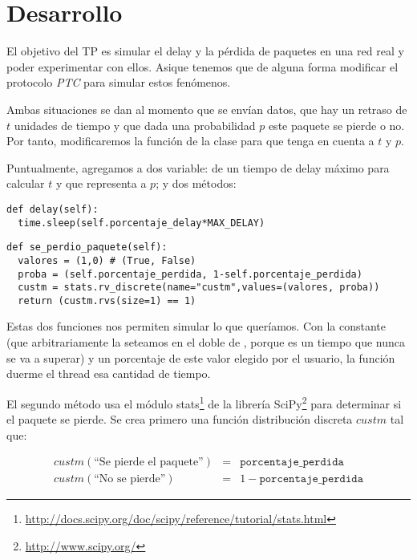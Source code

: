 \section{Desarrollo}

El objetivo del TP es simular el delay y la p\'erdida de paquetes en una red real y poder experimentar con ellos. Asique tenemos que de alguna forma modificar el protocolo \emph{PTC} para simular estos fen\'omenos. 

Ambas situaciones se dan al momento que se env\'ian datos, que hay un retraso de $t$ unidades de tiempo y que dada una probabilidad $p$ este paquete se pierde o no. Por tanto, modificaremos la funci\'on  de la clase  para que tenga en cuenta a $t$ y $p$. 

Puntualmente, agregamos a  dos variable:  de un tiempo de delay m\'aximo para calcular $t$ y  que representa a $p$; y dos m\'etodos: 

\begin{verbatim}
def delay(self): 
  time.sleep(self.porcentaje_delay*MAX_DELAY)
\end{verbatim}

\begin{verbatim}
def se_perdio_paquete(self):
  valores = (1,0) # (True, False)
  proba = (self.porcentaje_perdida, 1-self.porcentaje_perdida)
  custm = stats.rv_discrete(name="custm",values=(valores, proba))
  return (custm.rvs(size=1) == 1)
\end{verbatim}

Estas dos funciones nos permiten simular lo que quer\'iamos. Con la constante  (que arbitrariamente la seteamos en el doble de , porque es un tiempo que nunca se va a superar) y un porcentaje de este valor elegido por el usuario, la funci\'on  duerme el thread esa cantidad de tiempo. 

El segundo m\'etodo usa el m\'odulo stats\footnote{\url{http://docs.scipy.org/doc/scipy/reference/tutorial/stats.html}} de la librer\'ia SciPy\footnote{\url{http://www.scipy.org/}} para determinar si el paquete se pierde. Se crea primero una funci\'on distribuci\'on discreta $custm$ tal que: 

\begin{eqnarray*}
 custm(\text{``Se pierde el paquete''}) &=& \texttt{porcentaje\_perdida} \\
 custm(\text{``No se pierde''}) &=& 1 - \texttt{porcentaje\_perdida}
\end{eqnarray*}

